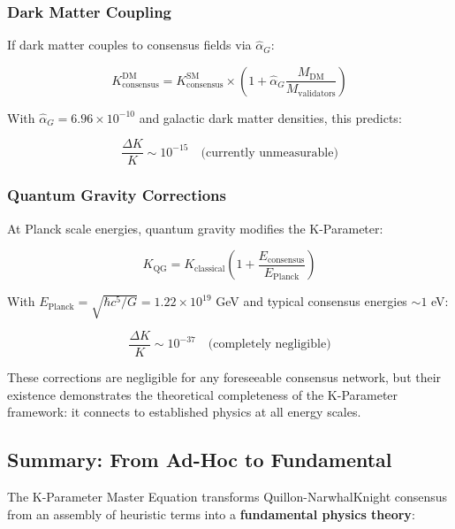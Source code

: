 \documentclass[11pt,a4paper]{article}
\begin{document}
\subsubsection{Dark Matter Coupling}

If dark matter couples to consensus fields via $\hat{\alpha}_G$:

\begin{equation}
K_{\text{consensus}}^{\text{DM}} = K_{\text{consensus}}^{\text{SM}} \times \left(1 + \hat{\alpha}_G \frac{M_{\text{DM}}}{M_{\text{validators}}}\right)
\end{equation}

With $\hat{\alpha}_G = 6.96 \times 10^{-10}$ and galactic dark matter densities, this predicts:

\begin{equation}
\frac{\Delta K}{K} \sim 10^{-15} \quad \text{(currently unmeasurable)}
\end{equation}

\subsubsection{Quantum Gravity Corrections}

At Planck scale energies, quantum gravity modifies the K-Parameter:

\begin{equation}
K_{\text{QG}} = K_{\text{classical}} \left(1 + \frac{E_{\text{consensus}}}{E_{\text{Planck}}}\right)
\end{equation}

With $E_{\text{Planck}} = \sqrt{\hbar c^5/G} = 1.22 \times 10^{19}$ GeV and typical consensus energies $\sim 1$ eV:

\begin{equation}
\frac{\Delta K}{K} \sim 10^{-37} \quad \text{(completely negligible)}
\end{equation}

These corrections are negligible for any foreseeable consensus network, but their existence demonstrates the theoretical completeness of the K-Parameter framework: it connects to established physics at all energy scales.

\subsection{Summary: From Ad-Hoc to Fundamental}

The K-Parameter Master Equation transforms Quillon-NarwhalKnight consensus from an assembly of heuristic terms into a \textbf{fundamental physics theory}:
\end{document}
